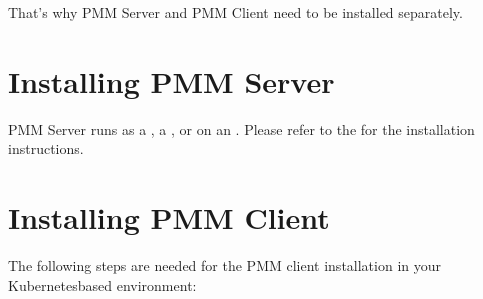 \documentclass[letterpaper,10pt,english]{sphinxmanual}
\begin{document}
That’s why PMM Server and PMM Client need to be installed separately.


\section{Installing PMM Server}
\label{\detokenize{monitoring:installing-pmm-server}}
PMM Server runs as a , a , or on an .
Please refer to the 
for the installation instructions.


\section{Installing PMM Client}
\label{\detokenize{monitoring:installing-pmm-client}}
The following steps are needed for the PMM client installation in your
Kubernetes\sphinxhyphen{}based environment:
\end{document}

